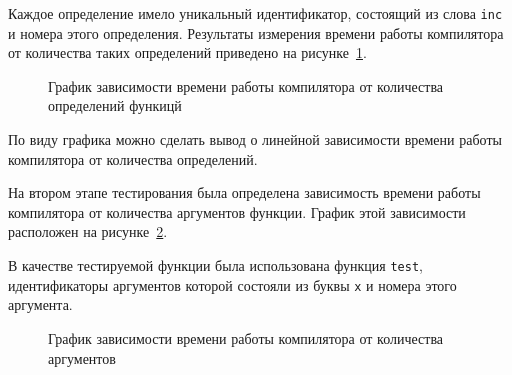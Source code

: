         

        Каждое определение имело уникальный идентификатор, состоящий из слова \verb,inc, и номера этого определения.
        Результаты измерения времени работы компилятора от количества таких определений приведено на рисунке~\ref{pic:compfuncs}.

        \begin{figure}[ht!]
            \centering
            \caption{График зависимости времени работы компилятора от количества определений функицй}
            \label{pic:compfuncs}
        \end{figure}

        По виду графика можно сделать вывод о линейной зависимости времени работы компилятора от количества определений.

        На втором этапе тестирования была определена зависимость времени работы компилятора от количества аргументов функции.
        График этой зависимости расположен на рисунке~\ref{pic:compargs}.

        В качестве тестируемой функции была использована функция \verb,test,, идентификаторы аргументов которой состояли из буквы \verb,x, и номера этого аргумента.

        \begin{figure}[ht!]
            \centering
            \caption{График зависимости времени работы компилятора от количества аргументов}
            \label{pic:compargs}
        \end{figure}

